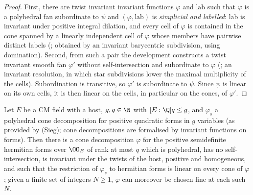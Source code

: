 \begin{proof}
First, there are twist invariant invariant functions $\varphi$ and $\mathrm{lab}$ such that $\varphi$ is a
polyhedral fan subordinate to $\psi$ and $(\varphi,\mathrm{lab})$ is \emph{simplicial and labelled}:
$\mathrm{lab}$ is invariant under positive integral dilation, and every cell of $\varphi$ is contained in the
cone spanned by a linearly independent cell of $\varphi$ whose members have pairwise distinct labels
(; obtained by an invariant
barycentric subdivision, using domination). Second, from such a pair the development constructs a twist invariant
smooth fan $\varphi'$ without self-intersection and subordinate to $\varphi$
(; an invariant resolution, in which star
subdivisions lower the maximal multiplicity of the cells). Subordination is transitive, so $\varphi'$ is
subordinate to $\psi$. Since $\psi$ is linear on its own cells, it is then linear on the cells, in
particular on the cones, of $\varphi'$.
\end{proof}

\begin{proposition}\label{pf:lift1:fan}
Let $E$ be a CM field with a host, $g,q\in\N$ with $[E:\Q]q\le g$, and $\varphi_s$ a polyhedral cone
decomposition for positive quadratic forms in $g$ variables (as provided by (Sieg); cone decompositions
are formalised by invariant functions on forms). Then there is a cone decomposition $\varphi$ for the
positive semidefinite hermitian forms over $\OO_E$ of rank at most $q$ which is polyhedral, has no
self-intersection, is invariant under the twists of the host, positive and homogeneous, and such that the
restriction of $\varphi_s$ to hermitian forms is linear on every cone of $\varphi$; given a finite set of
integers $N\ge1$, $\varphi$ can moreover be chosen fine at each such $N$.
\end{proposition}

